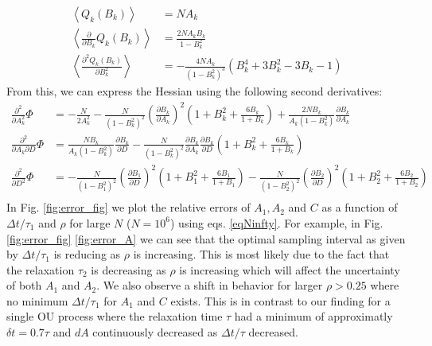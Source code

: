\documentclass[%
 reprint,
 amsmath,amssymb,
 aps,
]{revtex4-1}
\begin{document}
\begin{equation}
	\begin{aligned}
	\left\langle Q_{k}(B_{k})\right\rangle &= NA_{k}\\
	\left\langle\frac{\partial}{\partial B_{k}}Q_{k}(B_{k})\right\rangle &=  \frac{2NA_{k}B_{k}}{1-B_{k}^{2}}\\
	\left\langle\frac{\partial^{2}Q_{k}(B_{k})}{\partial B_{k}^{2}}\right\rangle &= 
	-\frac{4NA_{k}}{(1-B_{k}^{2})^{3}}\left(B_{k}^{4}+3B_{k}^{2}-3B_{k}-1\right)
	\end{aligned}
\end{equation}
From this, we can express the Hessian using the following second derivatives:
\begin{equation}\label{eqNinfty}
	\begin{aligned}
		\frac{\partial^{2}}{\partial A_{k}^2}\Phi &= -\frac{N}{2A_{k}^{2}} 
		- \frac{N}{(1-B_{k}^{2})^{2}}\left(\frac{\partial B_{k}}{\partial A_{k}}\right)^{2}
		\left(1+B_{k}^{2}+\frac{6B_{k}}{1+B_{k}}\right)+\frac{2NB_{k}}{A_{k}(1-B_{k}^{2})}\frac{\partial B_{k}}{\partial A_{k}}\\
		\frac{\partial^{2}}{\partial A_{k}\partial D}\Phi &=
		\frac{NB_{k}}{A_{k}(1-B_{k}^{2})}\frac{\partial B_{k}}{\partial D}
		-\frac{N}{(1-B_{k}^{2})^{2}}\frac{\partial B_{k}}{\partial A_{k}}\frac{\partial B_{k}}{\partial D}
		\left(1+B_{k}^{2}+\frac{6B_{k}}{1+B_{k}}\right)\\
		\frac{\partial^{2}}{\partial D^2}\Phi &=
		- \frac{N}{(1-B_{1}^{2})^{2}}\left(\frac{\partial B_{1}}{\partial D}\right)^{2}
		\left(1+B_{1}^{2}+\frac{6B_{1}}{1+B_{1}}\right)
		- \frac{N}{(1-B_{2}^{2})^{2}}\left(\frac{\partial B_{2}}{\partial D}\right)^{2}
		\left(1+B_{2}^{2}+\frac{6B_{2}}{1+B_{2}}\right)\\
	\end{aligned}
\end{equation}
In Fig. \ref{fig:error_fig} we plot the relative errors of $A_{1},A_{2}$ and $C$ as a function of $\Delta t/\tau_{1}$ and $\rho$ for large $N$ ($N=10^{6}$) using eqs. \ref{eqNinfty}.  For example, in Fig.\ref{fig:error_fig} \ref{fig:error_A} we can see that the optimal sampling interval as given by $\Delta t/\tau_{1}$ is reducing as $\rho$ is increasing.  This is most likely due to the fact that the relaxation $\tau_{2}$ is decreasing as $\rho$ is increasing which will affect the uncertainty of both $A_{1}$ and $A_{2}$.  We also observe a shift in behavior for larger $\rho>0.25$ where no minimum $\Delta t/\tau_{1}$ for $A_{1}$ and $C$ exists.  This is in contrast to our finding for a single OU process \cite{RN91} where the relaxation time $\tau$ had a minimum of approximatly $\delta t = 0.7\tau$ and $dA$ continuously decreased as $\Delta t/\tau$ decreased.
\end{document}
